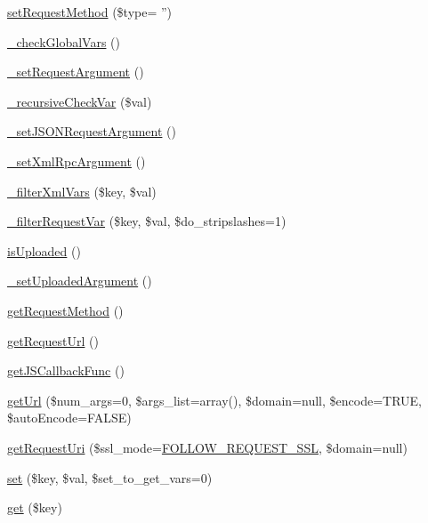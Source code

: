 \begin{DoxyCompactItemize}
\hyperlink{classContext_aa47d184757d451009f0597153d323ccc}{set\-Request\-Method} (\$type= '')
\item 
\hyperlink{classContext_a8030f7c76467bfcec812be76f55571cd}{\-\_\-check\-Global\-Vars} ()
\item 
\hyperlink{classContext_acfc274753d9687732458bfaba540c120}{\-\_\-set\-Request\-Argument} ()
\item 
\hyperlink{classContext_aae89f13e0d99577a6cb8a3bac584cee1}{\-\_\-recursive\-Check\-Var} (\$val)
\item 
\hyperlink{classContext_ae07924273ca1b17fe67a7cf978d762fc}{\-\_\-set\-J\-S\-O\-N\-Request\-Argument} ()
\item 
\hyperlink{classContext_abaa9eeef192a9e4b48a06d0af9b1fd05}{\-\_\-set\-Xml\-Rpc\-Argument} ()
\item 
\hyperlink{classContext_a8104d3bb19322baf793f4a3cc0aad078}{\-\_\-filter\-Xml\-Vars} (\$key, \$val)
\item 
\hyperlink{classContext_a3c411bc0bf786b605af4a7af8ad3ee53}{\-\_\-filter\-Request\-Var} (\$key, \$val, \$do\-\_\-stripslashes=1)
\item 
\hyperlink{classContext_a65ee4d61d0211c8a3f0eeb4251c85892}{is\-Uploaded} ()
\item 
\hyperlink{classContext_a9c821f96670ef47c7139bafc6b39091b}{\-\_\-set\-Uploaded\-Argument} ()
\item 
\hyperlink{classContext_a6912ff86e08ef782a296b77ff1307481}{get\-Request\-Method} ()
\item 
\hyperlink{classContext_ace7f220a4d945de0172f0c1fc98fe31e}{get\-Request\-Url} ()
\item 
\hyperlink{classContext_ab2e157a87d2b960d78b2c3f35ae7da23}{get\-J\-S\-Callback\-Func} ()
\item 
\hyperlink{classContext_aa60b75d32d4923bb3b9854985a82ce36}{get\-Url} (\$num\-\_\-args=0, \$args\-\_\-list=array(), \$domain=null, \$encode=T\-R\-U\-E, \$auto\-Encode=F\-A\-L\-S\-E)
\item 
\hyperlink{classContext_aa79578cfccee4d7f7c4890dc6e36ff90}{get\-Request\-Uri} (\$ssl\-\_\-mode=\hyperlink{Context_8class_8php_a546ef85538017b41b2928e818066989d}{F\-O\-L\-L\-O\-W\-\_\-\-R\-E\-Q\-U\-E\-S\-T\-\_\-\-S\-S\-L}, \$domain=null)
\item 
\hyperlink{classContext_a9f79aa7aecf2e4d8006e517844523fc2}{set} (\$key, \$val, \$set\-\_\-to\-\_\-get\-\_\-vars=0)
\item 
\hyperlink{classContext_a90ce25d65fe6c9778421cbb36ab3def5}{get} (\$key)
\item 

\end{DoxyCompactItemize}
